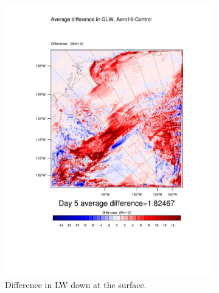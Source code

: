 \begin{figure}
	\begin{subfigure}{0.48\textwidth}
		\centering
		\includegraphics[width=\textwidth]{results/aero10/diff_Aero10_GLW_Day5.pdf}
		\caption{Difference in LW down at the surface.}
		\label{subfig:glw_r3Day5}
	\end{subfigure}
	\quad
	\begin{subfigure}{0.48\textwidth}
		\centering

\end{subfigure}
\end{figure}
